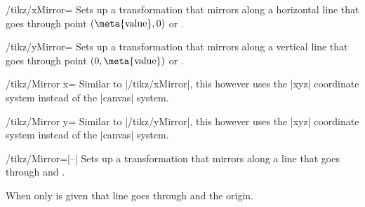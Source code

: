 \begin{key}{/tikz/xMirror=}
  Sets up a transformation that mirrors along a horizontal line that goes through point $(\text{\meta{value}}, 0)$ or .

\begin{codeexample}[preamble=\usetikzlibrary{transformations.mirror}]
\end{codeexample}
\end{key}

\begin{key}{/tikz/yMirror=}
  Sets up a transformation that mirrors along a vertical line that goes through point $(0, \text{\meta{value}})$ or .
\end{key}


\begin{key}{/tikz/Mirror x=}
  Similar to |/tikz/xMirror|, this however uses the |xyz| coordinate system instead of the |canvas| system.
\begin{codeexample}[preamble=\usetikzlibrary{transformations.mirror}]
\end{codeexample}
\end{key}

\begin{key}{/tikz/Mirror y=}
  Similar to |/tikz/yMirror|, this however uses the |xyz| coordinate system instead of the |canvas| system.
\end{key}


\begin{key}{/tikz/Mirror=|--|}
  Sets up a transformation that mirrors along a line that goes through  and .
  
  When only  is given that line goes through  and the origin.
\end{key}

\endinput